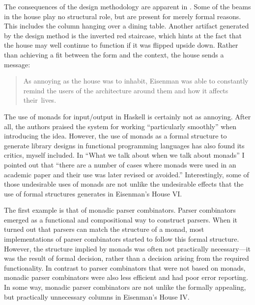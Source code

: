 The consequences of the design methodology are apparent in .
Some of the beams in the house play no structural role, but are present for merely formal
reasons. This includes the column hanging over a dining table. Another artifact generated
by the design method is the inverted red staircase, which hints at the fact that the house
may well continue to function if it was flipped upside down. Rather than achieving a fit between
the form and the context, the house sends a message:

\begin{quote}
As annoying as the house was to inhabit, Eisenman was able to constantly
remind the users of the architecture around them and how it affects
their~lives.
\end{quote}

The use of monads for input/output in Haskell is certainly not as annoying. After all, the
authors praised the system for working ``particularly smoothly'' when introducing the idea.
However, the use of monads as a formal structure to generate library designs in functional
programming languages has also found its critics, myself included. In ``What we talk about when we
talk about monads'' I pointed out that ``there are a number of cases where monads
were used in an academic paper and their use was later revised or avoided.''
Interestingly, some of those undesirable uses of monads are not unlike the undesirable effects
that the use of formal structures generates in Eisenman's House VI.

The first example is that of monadic parser combinators. Parser combinators
emerged as a functional and compositional way to construct parsers. When it turned out that
parsers can match the structure of a monad, most implementations of parser combinators
started to follow this formal structure. However, the structure implied by monads was often
not practically necessary---it was the result of formal decision, rather than a decision
arising from the required functionality. In contrast to parser combinators that were not based
on monads, monadic parser combinators were also less efficient and had poor error reporting.
In some way, monadic parser combinators are not unlike the formally appealing, but practically
unnecessary columns in Eisenman's House IV.


